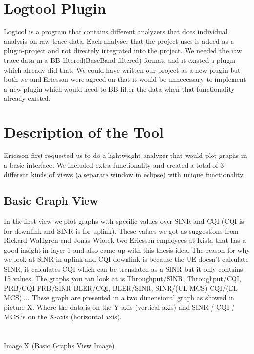 \documentclass[cropmarks, frame, english]{idamasterthesis}
\begin{document}
\section{Logtool Plugin}
Logtool is a program that contains different analyzers that does individual analysis on raw trace data. Each analyser that the project uses is added as a plugin-project and not directely integrated into the project. We needed the raw trace data in a BB-filtered(BaseBand-filtered) format, and it existed a plugin which already did that. We could have written our project as a new plugin but both we and Ericsson were agreed on that it would be unnecessary to implement a new plugin which would need to BB-filter the data when that functionality already existed.

\section{Description of the Tool}
Ericsson first requested us to do a lightweight analyzer that would plot graphs in a basic interface. We included extra functionality and created a total of 3 different kinds of views (a separate window in eclipse) with unique functionality.

\subsection{Basic Graph View}
In the first view we plot graphs with specific values over SINR and CQI (CQI is for downlink and SINR is for uplink). These values we got as suggestions from Rickard Wahlgren and Jonas Wiorek two Ericsson employees at Kista that has a good insight in layer 1 and also came up with this thesis idea. The reason for why we look at SINR in uplink and CQI downlink is because the UE doesn't calculate SINR, it calculates CQI which can be translated as a SINR but it only contains 15 values. The graphs you can look at is Throughput/SINR, Throughput/CQI, PRB/CQI PRB/SINR BLER/CQI, BLER/SINR, SINR/(UL MCS) CQI/(DL MCS) ... These graph are presented in a two dimensional graph as showed in picture X. Where the data is on the Y-axis (vertical axis) and SINR / CQI / MCS is on the X-axis (horizontal axis).
\\
\\
\\
       Image X (Basic Graphs View Image)
\\
\\
\end{document}

